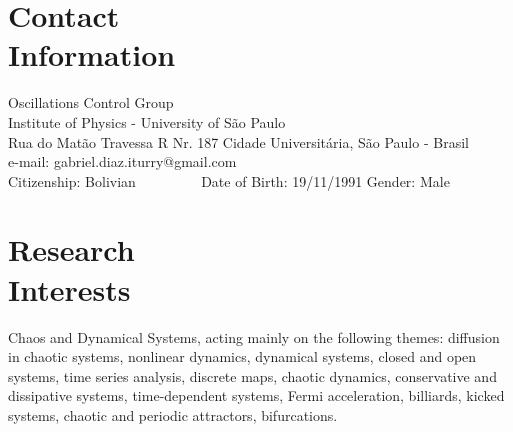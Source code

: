 \documentclass[margin,line]{resume}
\begin{document}
\begin{resume}

    \section{\mysidestyle Contact\\Information}
    \vspace{2mm}
    Oscillations Control Group                        \vspace{0mm}\\\vspace{0mm}%
    Institute of Physics - University of S\~ao Paulo  \vspace{0mm}\\\vspace{0mm}%
    Rua do Mat\~ao Travessa R Nr. 187 Cidade Universit\'aria, S\~ao Paulo - Brasil    \vspace{0mm}\\\vspace{0mm}%
    e-mail: gabriel.diaz.iturry@gmail.com  \vspace{0mm}\\\vspace{-4.5mm}%
    Citizenship: Bolivian     ~~~~~~~~    Date of Birth: 19/11/1991   \hfill Gender: Male               \vspace{0mm}\\\vspace{4.5mm}%
    
    \section{\mysidestyle Research\\Interests}

    Chaos and Dynamical Systems, acting mainly on the following themes: diffusion in chaotic systems, nonlinear dynamics, dynamical systems, closed and open systems,  time series analysis, discrete maps, chaotic dynamics, 
    conservative and dissipative systems, time-dependent systems, Fermi acceleration, billiards,
    kicked systems, chaotic and periodic attractors, bifurcations.



\end{resume}
\end{document}
